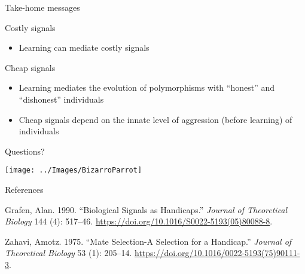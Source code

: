 \documentclass[
  ignorenonframetext,
]{beamer}
\providecommand{\tightlist}{%
  \setlength{\itemsep}{0pt}\setlength{\parskip}{0pt}}
\newlength{\cslhangindent}
\newlength{\cslentryspacingunit} %
\newenvironment{CSLReferences}[2] %
 {%
  \setlength{\parindent}{0pt}
  \ifodd #1
  \let\oldpar\par
  \def\par{\hangindent=\cslhangindent\oldpar}
  \fi
  \setlength{\parskip}{#2\cslentryspacingunit}
 }%
 {}
\begin{document}
\begin{frame}{Take-home messages}
\protect\hypertarget{take-home-messages}{}
\begin{block}{Costly signals}
\protect\hypertarget{costly-signals}{}
\begin{itemize}
\tightlist
\item
  Learning can mediate costly signals
\end{itemize}
\end{block}

\begin{block}{Cheap signals}
\protect\hypertarget{cheap-signals}{}
\begin{itemize}
\tightlist
\item
  Learning mediates the evolution of polymorphisms with ``honest'' and
  ``dishonest'' individuals
\item
  Cheap signals depend on the innate level of aggression (before
  learning) of individuals
\end{itemize}
\end{block}
\end{frame}

\begin{frame}{Questions?}
\protect\hypertarget{questions}{}
\begin{center}\texttt{[image: ../Images/BizarroParrot]} \end{center}
\end{frame}

\begin{frame}{References}
\protect\hypertarget{references}{}
\hypertarget{refs}{}
\begin{CSLReferences}{1}{0}
\leavevmode{}%
Grafen, Alan. 1990. {``Biological Signals as Handicaps.''} \emph{Journal
of Theoretical Biology} 144 (4): 517--46.
\url{https://doi.org/10.1016/S0022-5193(05)80088-8}.

\leavevmode{}%
Zahavi, Amotz. 1975. {``Mate Selection\textemdash -{A} Selection for a
Handicap.''} \emph{Journal of Theoretical Biology} 53 (1): 205--14.
\url{https://doi.org/10.1016/0022-5193(75)90111-3}.

\end{CSLReferences}
\end{frame}
\end{document}
